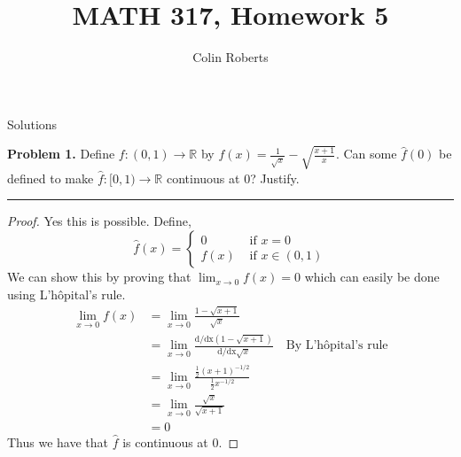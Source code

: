 \documentclass[leqno]{article}
\author{Colin Roberts}
\title{MATH 317, Homework 5}
\theoremstyle{nonumberplain}
\newtheorem{proof}{Proof}
\begin{document}
\maketitle
\begin{large}
\begin{center}
Solutions
\end{center}
\end{large}
\pagebreak

\noindent\textbf{Problem 1.} Define $f \colon (0,1) \to \mathbb{R}$ by $f(x) = \frac{1}{\sqrt{x}}-\sqrt{\frac{x+1}{x}}$.  Can some $\widehat{f}(0)$ be defined to make $\widehat{f}:[0,1) \to \mathbb{R}$ continuous at $0$? Justify.

\noindent\rule[0.5ex]{\linewidth}{1pt}

\begin{proof}
Yes this is possible.  Define,
	\[ \hat{f}(x)= \begin{cases}
			0 &\textrm{ if } x=0\\
			f(x) &\textrm{ if } x \in (0,1)
	\end{cases}\]
We can show this by proving that $\lim_{x \to 0} f(x)=0$ which can easily be done using L'h\^opital's rule.  
\begin{align*}
\lim_{x \to 0}f(x) &= \lim_{x \to 0} \frac{1-\sqrt{x+1}}{\sqrt{x}}\\
&=\lim_{x \to 0} \frac{\mathrm{d/dx}(1-\sqrt{x+1})}{\mathrm{d/dx}\sqrt{x}} \textrm{~~~By L'h\^opital's rule}\\
&=\lim_{x \to 0}  \frac{\frac{1}{2}(x+1)^{-1/2}}{\frac{1}{2}x^{-1/2}}\\
&= \lim_{x \to 0} \frac{\sqrt{x}}{\sqrt{x+1}}\\
&=0
\end{align*}
Thus we have that $\hat{f}$ is continuous at $0$.
\end{proof}

\pagebreak

\end{document}
